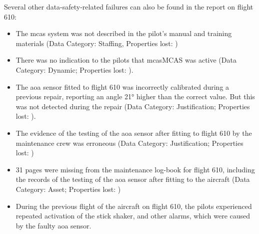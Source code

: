 Several other data-safety-related failures can also be found in the report on flight 610:

\begin{itemize}
    \item The \gls{mcas} system was not described in the pilot's manual and training materials (Data Category: Staffing, Properties lost: )
    \item There was no indication to the pilots that \gls{mcas}MCAS was active (Data Category: Dynamic; Properties lost: ).
    \item The \gls{aoa} sensor fitted to flight 610 was incorrectly calibrated during a previous repair,
      reporting an angle 21° higher than the correct value.
      But this was not detected during the repair
      (Data Category: Justification; Properties lost: ).
    \item The evidence of the testing of the \gls{aoa} sensor after fitting to flight 610 by the maintenance crew was erroneous (Data Category: Justification; Properties lost: )
    \item 31 pages were missing from the maintenance log-book for flight 610, including the records of the testing of the \gls{aoa} sensor after fitting to the aircraft (Data Category: Asset; Properties lost: )
    \item During the previous flight of the aircraft on flight 610, the pilots experienced repeated activation of the stick shaker, and other alarms, which were caused by the faulty \gls{aoa} sensor.

\end{itemize}
